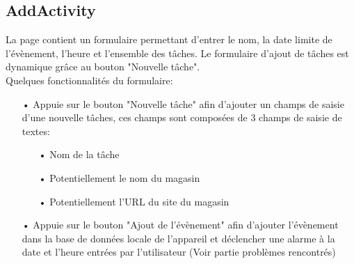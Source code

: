 \documentclass[12pt,a4paper]{report}
\begin{document}
\subsection{AddActivity}
\begin{flushleft}
\justify
La page contient un formulaire permettant d'entrer le nom, la date limite de l'évènement, l'heure et l'ensemble des tâches. Le formulaire d'ajout de tâches est dynamique grâce au bouton "Nouvelle tâche".\\

Quelques fonctionnalités du formulaire:
\begin{itemize}
\item[•] Appuie sur le bouton "Nouvelle tâche" afin d'ajouter un champs de saisie d'une nouvelle tâches, ces champs sont composées de 3 champs de saisie de textes:
\begin{itemize}
\item[•] Nom de la tâche
\item[•] Potentiellement le nom du magasin
\item[•] Potentiellement l'URL du site du magasin
\end{itemize}
\item[•] Appuie sur le bouton "Ajout de l'évènement" afin d'ajouter l'évènement dans la base de données locale de l'appareil et déclencher une alarme à la date et l'heure entrées par l'utilisateur (Voir partie problèmes rencontrés)
\end{itemize}
\begin{figure}
    \centering
    \begin{subfigure}[b]{0.3\textwidth}

\end{subfigure}
\end{figure}
\end{flushleft}
\end{document}

